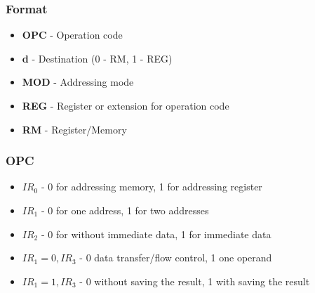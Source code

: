 \begin{frame}
    \frametitle{Format}
    \begin{table}[]
        \begin{itemize}
            \item \textbf{OPC} - Operation code
            \item \textbf{d} - Destination (0 - RM, 1 - REG)
            \item \textbf{MOD} - Addressing mode
            \item \textbf{REG} - Register or extension for operation code
            \item \textbf{RM} - Register/Memory
        \end{itemize}
    \end{table}
\end{frame}

\begin{frame}
    \frametitle{OPC}
    \begin{itemize}
        \item $IR_{0}$ - 0 for addressing memory, 1 for addressing register
        \item $IR_{1}$ - 0 for one address, 1 for two addresses
        \item $IR_{2}$ - 0 for without immediate data, 1 for immediate data
        \item $IR_{1}=0, IR_{3}$ - 0 data transfer/flow control, 1 one operand
        \item $IR_{1}=1, IR_{3}$ - 0 without saving the result, 1 with saving the result
    \end{itemize}
\end{frame}


